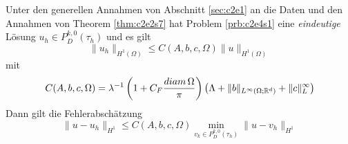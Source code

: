 \documentclass[../skript.tex]{subfiles}
\begin{document}
 \begin{theorem}\label{thm:c2e4s1}
 	Unter den generellen Annahmen von Abschnitt \cref{sec:c2e1} an die Daten und den Annahmen von Theorem \cref{thm:c2e2s7} hat Problem \cref{prb:c2e4s1} eine \emph{eindeutige} Lösung $u_h\in P^{k,0}_D(\tau_h)$ und es gilt
 	\[
 		\|u_h\|_{H^1(\Omega)}\leq C(A,b,c,\Omega)\|u\|_{H^1(\Omega)} 
 	\]
 	mit 
 	\[
 		C(A,b,c,\Omega) = \lambda^{-1}\left( 1+C_F\frac{diam\,\Omega}{\pi} \right) \left(\Lambda + \|b\|_{L^\infty(\Omega;\mathbb{R}^d)}+\|c\|_L^\infty\right)
 	\]
 	Dann gilt die Fehlerabschätzung
 	\[
 		\|u-u_h\|_{H^1}\leq C(A,b,c,\Omega)\min_{v_k\in P^{k,0}_D(\tau_h)}\|u-v_h\|_{H^1}
 	\]

 \end{theorem}
\end{document}
